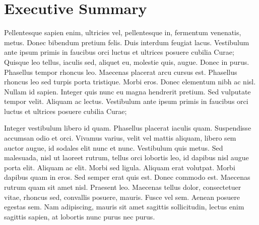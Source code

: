 \part{Executive Summary}
Pellentesque sapien enim, ultricies vel, pellentesque in, fermentum venenatis, metus. Donec bibendum pretium felis. Duis interdum feugiat lacus. Vestibulum ante ipsum primis in faucibus orci luctus et ultrices posuere cubilia Curae; Quisque leo tellus, iaculis sed, aliquet eu, molestie quis, augue. Donec in purus. Phasellus tempor rhoncus leo. Maecenas placerat arcu cursus est. Phasellus rhoncus leo sed turpis porta tristique. Morbi eros. Donec elementum nibh ac nisl. Nullam id sapien. Integer quis nunc eu magna hendrerit pretium. Sed vulputate tempor velit. Aliquam ac lectus. Vestibulum ante ipsum primis in faucibus orci luctus et ultrices posuere cubilia Curae;

Integer vestibulum libero id quam. Phasellus placerat iaculis quam. Suspendisse accumsan odio et orci. Vivamus varius, velit vel mattis aliquam, libero sem auctor augue, id sodales elit nunc et nunc. Vestibulum quis metus. Sed malesuada, nisl ut laoreet rutrum, tellus orci lobortis leo, id dapibus nisl augue porta elit. Aliquam ac elit. Morbi sed ligula. Aliquam erat volutpat. Morbi dapibus quam in eros. Sed semper erat quis est. Donec commodo est. Maecenas rutrum quam sit amet nisl. Praesent leo. Maecenas tellus dolor, consectetuer vitae, rhoncus sed, convallis posuere, mauris. Fusce vel sem. Aenean posuere egestas sem. Nam adipiscing, mauris sit amet sagittis sollicitudin, lectus enim sagittis sapien, at lobortis nunc purus nec purus.